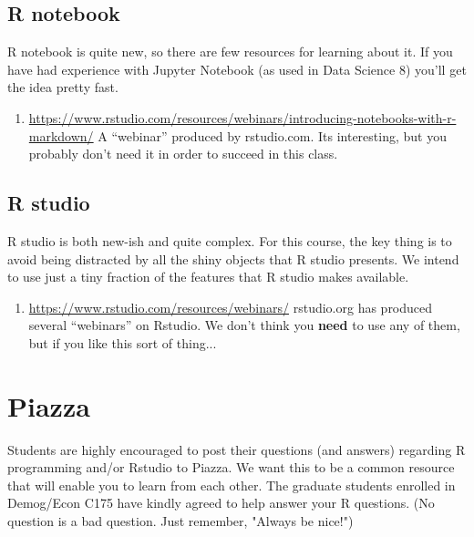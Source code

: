 \documentclass[11pt]{article}
\begin{document}
\subsection{R notebook}
\label{sec:Rnote}

R notebook is quite new, so there are few resources for learning about it. If you have had experience with Jupyter Notebook (as used in Data Science 8) you'll get the idea pretty fast. 
\begin{enumerate}
\item \url{https://www.rstudio.com/resources/webinars/introducing-notebooks-with-r-markdown/} A ``webinar'' produced by rstudio.com.  Its interesting, but you probably don't need it in order to succeed in this class.
\end{enumerate}

\subsection{R studio}
\label{sec:Rstud}

R studio is both new-ish and quite complex. For this course, the key thing is to avoid being distracted by all the shiny objects that R studio presents.  We intend to use just a tiny fraction of the features that R studio makes available.
\begin{enumerate}
\item \url{https://www.rstudio.com/resources/webinars/} rstudio.org has produced several ``webinars'' on Rstudio.  We don't think you \textbf{need} to  use any of them, but if you like this sort of thing...
\end{enumerate}

\section{Piazza}
\label{sec:piazza}

Students are highly encouraged to post their questions (and answers)
regarding R programming and/or Rstudio to Piazza. We want this to be a common
resource that will enable you to learn from each other. The graduate
students enrolled in Demog/Econ C175 have kindly agreed to help answer your R
questions. (No question is a bad question. Just remember, "Always be
nice!")
\end{document}
